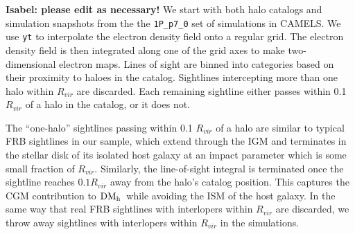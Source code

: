 \documentclass[twocolumn]{aastex631}
\newcommand{\dmh}{\ensuremath{{\rm DM}_\textrm{h}}}
\begin{document}
\textbf{Isabel: please edit as necessary!}
We start with both halo catalogs and simulation snapshots from the the \texttt{1P\_p7\_0} set of simulations in CAMELS. We use \texttt{yt}\citep{yt} to interpolate the electron density field onto a regular grid. The electron density field is then integrated along one of the grid axes to make two-dimensional electron maps. Lines of sight are binned into categories based on their proximity to haloes in the catalog. Sightlines intercepting more than one halo within $R_{vir}$ are discarded. Each remaining sightline either passes within 0.1 $R_{vir}$ of a halo in the catalog, or it does not. 

The ``one-halo'' sightlines passing within 0.1 $R_{vir}$ of a halo are similar to typical FRB sightlines in our sample, which extend through the IGM and terminates in the stellar disk of its isolated host galaxy at an impact parameter which is some small fraction of $R_{vir}$. Similarly, the line-of-sight integral is terminated once the sightline reaches $0.1 R_{vir}$ away from the halo's catalog position. This captures the CGM contribution to \dmh\ while avoiding the ISM of the host galaxy. In the same way that real FRB sightlines with interlopers within $R_{vir}$ are discarded, we throw away sightlines with interlopers within $R_{vir}$ in the simulations. 
\end{document}
